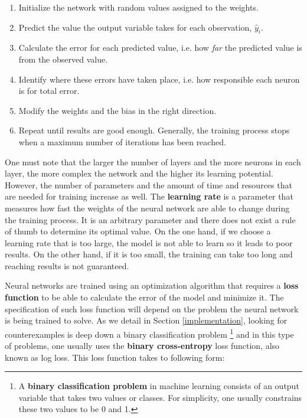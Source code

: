 \documentclass[11pt]{article}
\theoremstyle{definition}
\begin{document}
\begin{enumerate}
    \item Initialize the network with random values assigned to the weights.
    \item Predict the value the output variable takes for each observation, $\hat{y}_i$.
    \item Calculate the error for each predicted value, i.e. how \textit{far} the predicted value is from the observed value.
    \item Identify where these errors have taken place, i.e. how responsible each neuron is for total error.
    \item Modify the weights and the bias in the right direction. 
    \item Repeat until results are good enough. Generally, the training process stops when a maximum number of iterations has been reached. 
\end{enumerate}

One must note that the larger the number of layers and the more neurons in each layer, the more complex the network and the higher its learning potential. However, the number of parameters and the amount of time and resources that are needed for training increase as well. The \textbf{learning rate} is a parameter that measures how fast the weights of the neural network are able to change during the training process. It is an arbitrary parameter and there does not exist a rule of thumb to determine its optimal value. On the one hand, if we choose a learning rate that is too large, the model is not able to learn so it leads to poor results. On the other hand, if it is too small, the training can take too long and reaching results is not guaranteed. 

Neural networks are trained using an optimization algorithm that requires a \textbf{loss function} to be able to calculate the error of the model and minimize it. The specification of such loss function will depend on the problem the neural network is being trained to solve. As we detail in Section \ref{implementation}, looking for counterexamples is deep down a binary classification problem \footnote{A \textbf{binary classification problem} in machine learning consists of an output variable that takes two values or classes. For simplicity, one usually constrains these two values to be 0 and 1.} and in this type of problems, one usually uses the \textbf{binary cross-entropy} loss function, also known as log loss. This loss function takes to following form: 
\end{document}
